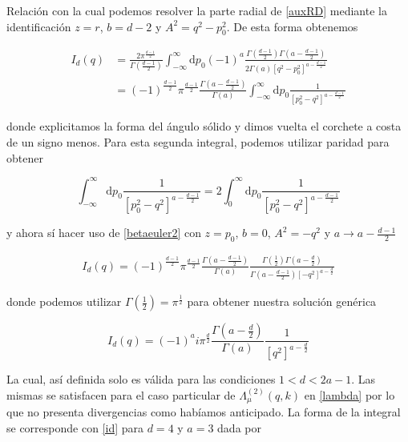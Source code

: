 \documentclass{article}
\numberwithin{equation}{section}
\begin{document}
Relación con la cual podemos resolver la parte radial de \ref{auxRD} mediante la identificación $ z=r $, $ b= d-2 $ y $ A^2=q^2 -p_0^2 $. De esta forma obtenemos

\begin{equation}\label{key}
\begin{aligned}
I_d(q)&= \frac{2 \pi^{\frac{d-1}{2}}}{\Gamma (\frac{d-1}{2})} \int_{-\infty}^{\infty}\mathrm{d}p_0 (-1)^a \frac{\Gamma(\frac{d-1}{2} ) \Gamma(a - \frac{d-1}{2})}{2 \Gamma(a) \left[q^2 - p_0^2\right]^{a-\frac{d-1}{2}}}\\
&= (-1)^{\frac{d-1}{2}} \pi^{\frac{d-1}{2}}  \frac{\Gamma(a - \frac{d-1}{2} )}{\Gamma(a)}\int_{-\infty}^{\infty}\mathrm{d}p_0 \frac{1}{\left[p_0^2 - q^2\right]^{a-\frac{d-1}{2}}}
\end{aligned}
\end{equation}

donde explicitamos la forma del ángulo sólido y dimos vuelta el corchete a costa de un signo menos. Para esta segunda integral, podemos utilizar paridad para obtener

\begin{equation}\label{key}
\int_{-\infty}^{\infty}\mathrm{d}p_0 \frac{1}{\left[p_0^2 - q^2\right]^{a-\frac{d-1}{2}}} = 2 \int_{0}^{\infty}\mathrm{d}p_0 \frac{1}{\left[p_0^2 - q^2\right]^{a-\frac{d-1}{2}}}
\end{equation}

y ahora sí hacer uso de \ref{betaeuler2} con $ z=p_0 $, $ b= 0 $, $ A^2=-q^2$ y $ a \rightarrow a-\frac{d-1}{2} $ 

\begin{equation}\label{key}
\begin{aligned}
I_d(q)= (-1)^{\frac{d-1}{2}} \pi^{\frac{d-1}{2}}  \frac{\Gamma(a - \frac{d-1}{2} )}{\Gamma(a)} \frac{\Gamma(\frac{1}{2})\Gamma(a - \frac{d}{2} )}{\Gamma(a-\frac{d-1}{2})\left[ -q^2\right]^{a-\frac{d}{2}} }  
\end{aligned}
\end{equation}

donde podemos utilizar $ \Gamma(\frac{1}{2})= \pi^{\frac{1}{2}} $ para obtener nuestra solución genérica

\begin{equation}\label{id}
I_d(q)=(-1)^{a} i \pi^{\frac{d}{2}} \frac{\Gamma(a - \frac{d}{2} )}{\Gamma(a)} \frac{1}{\left[q^2\right]^{a-\frac{d}{2}}}
\end{equation}


La cual, así definida solo es válida para las condiciones $ 1<d<2a-1 $. Las mismas se satisfacen para el caso particular de $ \Lambda_{\mu}^{(2)}(q,k) $ en \ref{lambda} por lo que no presenta divergencias como habíamos anticipado. La forma de la integral se corresponde con \ref{id} para $ d=4 $ y $ a=3 $ dada por
\end{document}

